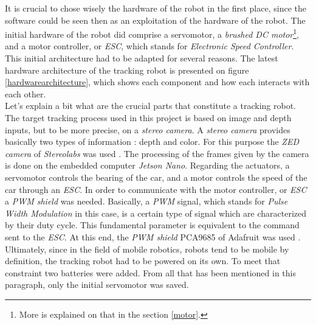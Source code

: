 		It is crucial to chose wisely the hardware of the robot in the first place, since
		the software could be seen then as an exploitation of the hardware of 
		the robot. The initial hardware of the robot did comprise
		a servomotor, a \textit{brushed DC motor}\footnote{More is explained 
		on that in the section \vref{motor}.}, and a motor controller, or \textit{ESC}, which
		stands for \textit{ Electronic Speed Controller}.
		\\\indent This initial architecture had to be adapted for several reasons.
		The latest hardware architecture of the tracking robot is
		presented on figure \vref{hardwarearchitecture}, which
		shows each component and how each interacts with each other.
		\\\indent Let's explain a bit what are the crucial parts
		that constitute a tracking robot. The target tracking process used
		in this project is based on image and depth inputs, but to be more
		precise, on a \textit{stereo camera}. A \textit{stereo camera}
		provides basically two types of information : depth and color.
		For this purpose the \textit{ZED camera} of \textit{Stereolabs}
		was used \cite{zeddoc}. The processing of the frames
		given by the camera is done on the embedded computer
		\textit{Jetson Nano}. Regarding the actuators, a servomotor
		controls the bearing of the car, and a motor controls the speed
		of the car through an \textit{ESC}. In order to communicate
		with the motor controller, or \textit{ESC} a \textit{PWM shield}
		was needed. Basically, a \textit{PWM} signal, which stands for
		\textit{Pulse Width Modulation} in this case, is a certain type
		of signal which are characterized by their duty cycle. This 
		fundamental parameter is equivalent to the command sent 
		to the \textit{ESC}. At this end, the \textit{PWM shield} PCA9685
		of Adafruit was used \cite{adafruitpwm}. Ultimately, since
		in the field of mobile robotics, robots tend to be mobile by definition,
		the tracking robot had to be powered on its own. To 
		meet that constraint two batteries were added. From all that has
		been mentioned in this paragraph, only the initial servomotor was
		saved.
		
		\FloatBarrier

